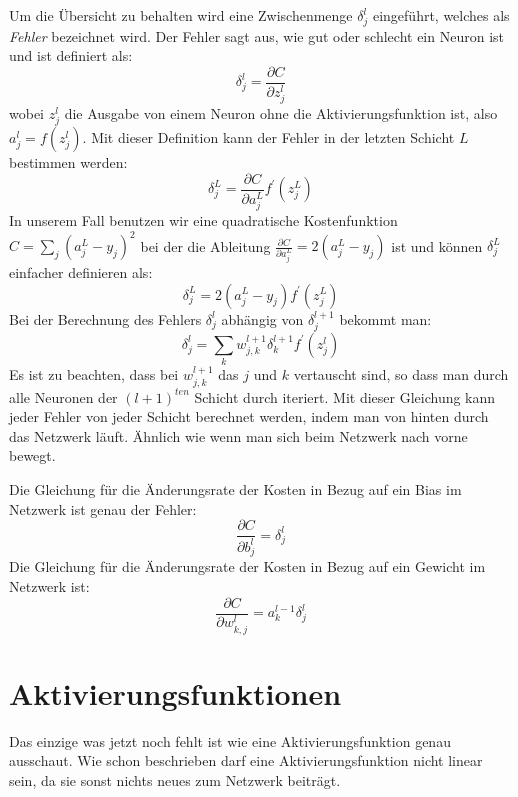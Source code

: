 \documentclass[12pt,a4paper]{report}
\begin{document}
Um die Übersicht zu behalten wird eine Zwischenmenge $\delta^l_j$ eingeführt, welches als \textit{Fehler} bezeichnet wird.
Der Fehler sagt aus, wie gut oder schlecht ein Neuron ist und ist definiert als:
\[\delta^l_j = \frac{\partial C}{\partial z^l_j}\]
wobei $z^l_j$ die Ausgabe von einem Neuron ohne die Aktivierungsfunktion ist, also $a^l_j = f(z^l_j)$.
Mit dieser Definition kann der Fehler in der letzten Schicht $L$ bestimmen werden:
\[\delta^L_j = \frac{\partial C}{\partial a^L_j}f^\prime(z^L_j)\]
In unserem Fall benutzen wir eine quadratische Kostenfunktion $C = \sum_{j}(a^L_j - y_j)^2$ bei
der die Ableitung $\frac{\partial C}{\partial a^L_j} = 2(a^L_j - y_j)$ ist und können $\delta^L_j$ einfacher definieren als:
\[\delta^L_j = 2(a^L_j - y_j)f^\prime(z^L_j)\]
Bei der Berechnung des Fehlers $\delta^l_j$ abhängig von $\delta^{l+1}_j$ bekommt man:
\[\delta^l_j = \sum_k w^{l+1}_{j,k}\delta^{l+1}_k f^\prime(z^l_j)\]
Es ist zu beachten, dass bei $w^{l+1}_{j,k}$ das $j$ und $k$ vertauscht sind, so dass man durch alle Neuronen der $(l+1)^{ten}$ Schicht durch iteriert.
Mit dieser Gleichung kann jeder Fehler von jeder Schicht berechnet werden, indem man von hinten durch das Netzwerk läuft.
Ähnlich wie wenn man sich beim Netzwerk nach vorne bewegt.

Die Gleichung für die Änderungsrate der Kosten in Bezug auf ein Bias im Netzwerk ist genau der Fehler:
\[\frac{\partial C}{\partial b^l_j} = \delta^l_j\]
Die Gleichung für die Änderungsrate der Kosten in Bezug auf ein Gewicht im Netzwerk ist:
\[\frac{\partial C}{\partial w^{l}_{k,j}} = a^{l-1}_k\delta^l_j\]

\section{Aktivierungsfunktionen}\label{sec:aktivierungsfunktionen}
Das einzige was jetzt noch fehlt ist wie eine Aktivierungsfunktion genau ausschaut.
Wie schon beschrieben darf eine Aktivierungsfunktion nicht linear sein, da sie sonst nichts neues zum Netzwerk beiträgt.
\end{document}
